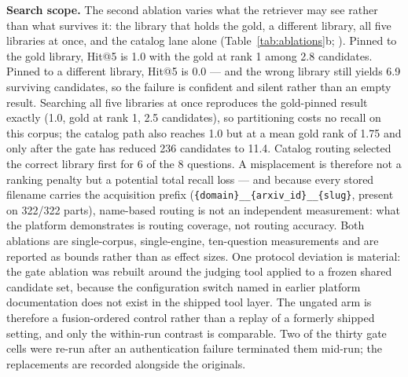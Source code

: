 \textbf{Search scope.}
The second ablation varies what the retriever may see rather than what
survives it: the library that holds the gold, a different library, all
five libraries at once, and the catalog lane alone
(Table~\ref{tab:ablations}b;
). Pinned to the gold library, Hit@5 is 1.0
with the gold at rank 1 among 2.8 candidates. Pinned to a different
library, Hit@5 is 0.0 --- and the wrong library still yields 6.9
surviving candidates, so the failure is confident and silent rather than
an empty result. Searching all five libraries at once reproduces the
gold-pinned result exactly (1.0, gold at rank 1, 2.5 candidates), so
partitioning costs no recall on this corpus; the catalog path also
reaches 1.0 but at a mean gold rank of 1.75 and only after the gate has
reduced 236 candidates to 11.4. Catalog routing selected the correct
library first for 6 of the 8 questions. A misplacement is therefore not a
ranking penalty but a potential total recall loss --- and because every
stored filename carries the acquisition prefix
(\texttt{\{domain\}\_\_\{arxiv\_id\}\_\_\{slug\}}, present on 322/322
parts), name-based routing is not an independent measurement: what the
platform demonstrates is routing coverage, not routing accuracy. Both
ablations are single-corpus, single-engine, ten-question measurements and
are reported as bounds rather than as effect sizes. One protocol deviation
is material: the gate ablation was rebuilt around the judging tool applied
to a frozen shared candidate set, because the configuration switch named in
earlier platform documentation does not exist in the shipped tool layer.
The ungated arm is therefore a fusion-ordered control rather than a replay
of a formerly shipped setting, and only the within-run contrast is
comparable. Two of the thirty gate cells were re-run after an
authentication failure terminated them mid-run; the replacements are
recorded alongside the originals.

